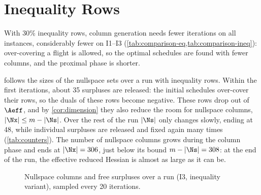 \section{Inequality Rows}
\label{sec:results-ineq}

With 30\% inequality rows, column generation needs fewer iterations on all instances,
considerably fewer on I1--I3 (\cref{tab:comparison-eq,tab:comparison-ineq}): over-covering a flight is allowed,
so the optimal schedules are found with fewer columns, and the proximal phase is shorter.

\medskip

 follows the sizes of the nullspace sets over a run with inequality rows.
Within the first iterations, about 35 surpluses are released: the initial schedules
over-cover their rows, so the duals of these rows become negative. These rows drop out of
$\Aeff$, and by \cref{cor:dimension} they also reduce the room for nullspace columns,
$|\Nx|\le m - |\Ns|$. Over the rest of the run $|\Ns|$ only changes slowly, ending at 48, while
individual surpluses are released and fixed again many times (\cref{tab:counters}). The number
of nullspace columns grows during the column phase and ends at $|\Nx| = 306$, just below its
bound $m - |\Ns| = 308$: at the end of the run, the effective reduced Hessian is almost as
large as it can be.

\begin{figure}[ht]
\centering
{}
\caption{Nullspace columns and free surpluses over a run (I3, inequality variant), sampled
every 20 iterations.}
\label{fig:sets}
\end{figure}

\medskip


